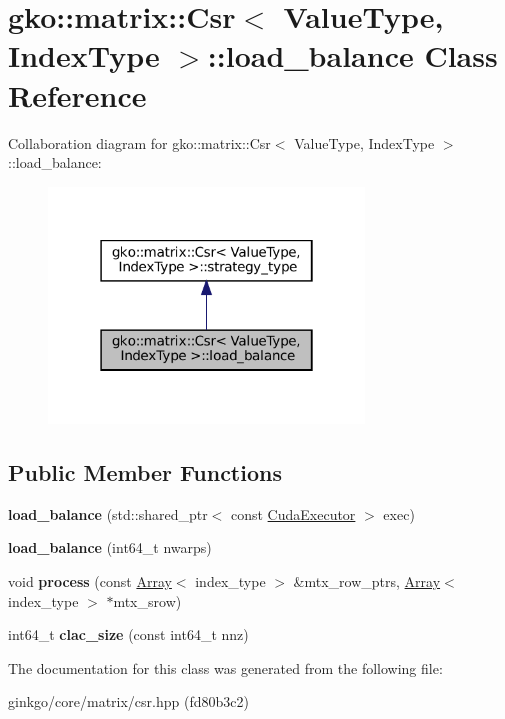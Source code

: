 \hypertarget{classgko_1_1matrix_1_1Csr_1_1load__balance}{}\section{gko\+:\+:matrix\+:\+:Csr$<$ Value\+Type, Index\+Type $>$\+:\+:load\+\_\+balance Class Reference}
\label{classgko_1_1matrix_1_1Csr_1_1load__balance}


Collaboration diagram for gko\+:\+:matrix\+:\+:Csr$<$ Value\+Type, Index\+Type $>$\+:\+:load\+\_\+balance\+:
\nopagebreak
\begin{figure}[H]
\begin{center}
\leavevmode
\includegraphics[width=238pt]{classgko_1_1matrix_1_1Csr_1_1load__balance__coll__graph}
\end{center}
\end{figure}
\subsection*{Public Member Functions}
\begin{DoxyCompactItemize}
\item 
\mbox{\label{classgko_1_1matrix_1_1Csr_1_1load__balance_ad80a0ef5dd9bb2e4f311e59e5e4e013e}} 
{\bfseries load\+\_\+balance} (std\+::shared\+\_\+ptr$<$ const \hyperlink{classgko_1_1CudaExecutor}{Cuda\+Executor} $>$ exec)
\item 
\mbox{\label{classgko_1_1matrix_1_1Csr_1_1load__balance_a851a72f0ac2f8be45982b5aa0b85d15d}} 
{\bfseries load\+\_\+balance} (int64\+\_\+t nwarps)
\item 
\mbox{\label{classgko_1_1matrix_1_1Csr_1_1load__balance_a8219420a14f2d6fc2242897900ce4448}} 
void {\bfseries process} (const \hyperlink{classgko_1_1Array}{Array}$<$ index\+\_\+type $>$ \&mtx\+\_\+row\+\_\+ptrs, \hyperlink{classgko_1_1Array}{Array}$<$ index\+\_\+type $>$ $\ast$mtx\+\_\+srow)
\item 
\mbox{\label{classgko_1_1matrix_1_1Csr_1_1load__balance_aafc499605813d57af41c57744d44e133}} 
int64\+\_\+t {\bfseries clac\+\_\+size} (const int64\+\_\+t nnz)
\end{DoxyCompactItemize}


The documentation for this class was generated from the following file\+:\begin{DoxyCompactItemize}
\item 
ginkgo/core/matrix/csr.\+hpp (fd80b3c2)\end{DoxyCompactItemize}
